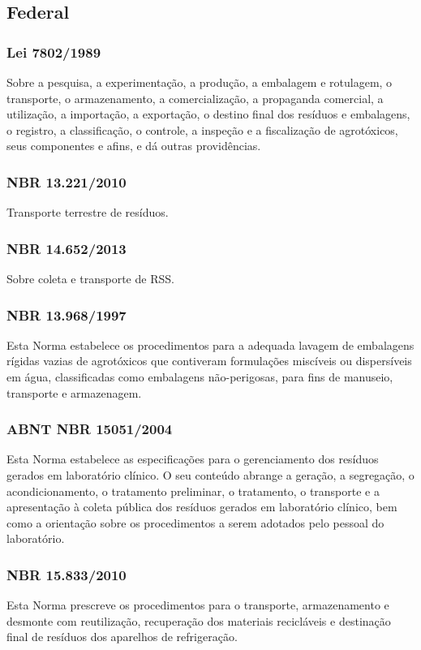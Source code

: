 \begin{subapend}
	\subsection{Federal}
	\begin{subsubapend}
		\subsubsection{Lei 7802/1989}
		Sobre a pesquisa, a experimentação, a produção, a embalagem e rotulagem, o transporte, o armazenamento, a comercialização, a propaganda comercial, a utilização, a importação, a exportação, o destino final dos resíduos e embalagens, o registro, a classificação, o controle, a inspeção e a fiscalização de agrotóxicos, seus componentes e afins, e dá outras providências.
		\subsubsection{NBR 13.221/2010}
		Transporte terrestre de resíduos.
		\subsubsection{NBR 14.652/2013}
		Sobre coleta e transporte de RSS.
		\subsubsection{NBR 13.968/1997}
		Esta Norma estabelece os procedimentos para a adequada lavagem de embalagens rígidas vazias de agrotóxicos que contiveram formulações miscíveis ou dispersíveis em água, classificadas como embalagens não-perigosas, para fins de manuseio, transporte e armazenagem.
		\subsubsection{ABNT NBR 15051/2004}
		Esta Norma estabelece as especificações para o gerenciamento dos resíduos gerados em laboratório clínico. O seu conteúdo abrange a geração, a segregação, o acondicionamento, o tratamento preliminar, o tratamento, o transporte e a apresentação à coleta pública dos resíduos gerados em laboratório clínico, bem como a orientação sobre os procedimentos a serem adotados pelo pessoal do laboratório.
		\subsubsection{NBR 15.833/2010}
		Esta Norma prescreve os procedimentos para o transporte, armazenamento e desmonte com reutilização, recuperação dos materiais recicláveis e destinação final de resíduos dos aparelhos de refrigeração.

\end{subsubapend}
\end{subapend}
